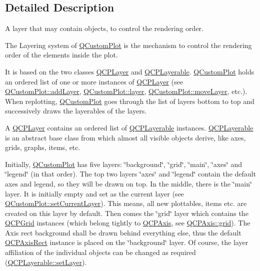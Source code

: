 \subsection{Detailed Description}
A layer that may contain objects, to control the rendering order. 

The Layering system of \mbox{\hyperlink{class_q_custom_plot}{Q\+Custom\+Plot}} is the mechanism to control the rendering order of the elements inside the plot.

It is based on the two classes \mbox{\hyperlink{class_q_c_p_layer}{Q\+C\+P\+Layer}} and \mbox{\hyperlink{class_q_c_p_layerable}{Q\+C\+P\+Layerable}}. \mbox{\hyperlink{class_q_custom_plot}{Q\+Custom\+Plot}} holds an ordered list of one or more instances of \mbox{\hyperlink{class_q_c_p_layer}{Q\+C\+P\+Layer}} (see \mbox{\hyperlink{class_q_custom_plot_ad5255393df078448bb6ac83fa5db5f52}{Q\+Custom\+Plot\+::add\+Layer}}, \mbox{\hyperlink{class_q_custom_plot_a0a96244e7773b242ef23c32b7bdfb159}{Q\+Custom\+Plot\+::layer}}, \mbox{\hyperlink{class_q_custom_plot_ae896140beff19424e9e9e02d6e331104}{Q\+Custom\+Plot\+::move\+Layer}}, etc.). When replotting, \mbox{\hyperlink{class_q_custom_plot}{Q\+Custom\+Plot}} goes through the list of layers bottom to top and successively draws the layerables of the layers.

A \mbox{\hyperlink{class_q_c_p_layer}{Q\+C\+P\+Layer}} contains an ordered list of \mbox{\hyperlink{class_q_c_p_layerable}{Q\+C\+P\+Layerable}} instances. \mbox{\hyperlink{class_q_c_p_layerable}{Q\+C\+P\+Layerable}} is an abstract base class from which almost all visible objects derive, like axes, grids, graphs, items, etc.

Initially, \mbox{\hyperlink{class_q_custom_plot}{Q\+Custom\+Plot}} has five layers\+: \char`\"{}background\char`\"{}, \char`\"{}grid\char`\"{}, \char`\"{}main\char`\"{}, \char`\"{}axes\char`\"{} and \char`\"{}legend\char`\"{} (in that order). The top two layers \char`\"{}axes\char`\"{} and \char`\"{}legend\char`\"{} contain the default axes and legend, so they will be drawn on top. In the middle, there is the \char`\"{}main\char`\"{} layer. It is initially empty and set as the current layer (see \mbox{\hyperlink{class_q_custom_plot_a73a6dc47c653bb6f8f030abca5a11852}{Q\+Custom\+Plot\+::set\+Current\+Layer}}). This means, all new plottables, items etc. are created on this layer by default. Then comes the \char`\"{}grid\char`\"{} layer which contains the \mbox{\hyperlink{class_q_c_p_grid}{Q\+C\+P\+Grid}} instances (which belong tightly to \mbox{\hyperlink{class_q_c_p_axis}{Q\+C\+P\+Axis}}, see \mbox{\hyperlink{class_q_c_p_axis_a63f1dd2df663680d2a8d06c19592dd63}{Q\+C\+P\+Axis\+::grid}}). The Axis rect background shall be drawn behind everything else, thus the default \mbox{\hyperlink{class_q_c_p_axis_rect}{Q\+C\+P\+Axis\+Rect}} instance is placed on the \char`\"{}background\char`\"{} layer. Of course, the layer affiliation of the individual objects can be changed as required (\mbox{\hyperlink{class_q_c_p_layerable_ab0d0da6d2de45a118886d2c8e16d5a54}{Q\+C\+P\+Layerable\+::set\+Layer}}).

